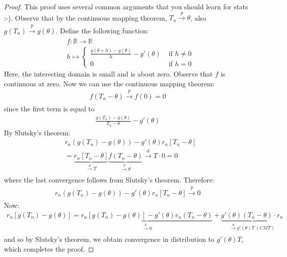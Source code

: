 \documentclass[11pt]{scrartcl}
\newcommand{\R}[0]{\mathbb{R}}
\theoremstyle{definition}
\theoremstyle{remark}
\begin{document}
{\begin{proof}
	This proof uses several common arguments that you should learn for stats :-). Observe that by the continuous mapping theorem, $T_n \xrightarrow[]{p} \theta$, also $g(T_n) \xrightarrow[]{p} g(\theta)$. Define the following function: 
	\begin{align*}
		& f: \R \rightarrow \R \\
		& h \mapsto \begin{cases}
			\frac{g(\theta + h) - g (\theta)}{h} - g'(\theta) & \text{ if } h \neq 0 \\
			0 	& \text{ if } h = 0 
		\end{cases}	
	\end{align*}
	Here, the interesting domain is small and is about zero. Observe that $f$ is continuous at zero. Now we can use the continuous mapping theorem: 
	\begin{align*}
			f(T_n - \theta) \xrightarrow[]{p} f(0) = 0 
	\end{align*}
	since the first term is equal to 
	\begin{align*}
		\frac{g(T_n) - g(\theta)}{T_n - \theta} - g'(\theta) 		
	\end{align*}
	By Slutsky's theorem: 
	\begin{align*} 
		& r_n (g(T_n) - g(\theta)) - g'(\theta ) r_n [T_n - \theta ] \\ 
		& = \underbrace{r_n [T_n - \theta]}_{\xrightarrow[]{d} T} \underbrace{f(T_n - \theta)}_{\xrightarrow[]{p} \theta} \xrightarrow[]{d} T \cdot 0 = 0 
	\end{align*} 
	where the last convergence follows from Slutsky's theorem. Therefore: 
	\begin{align*}
		r_n (g(T_n) - g(\theta)) - g'(\theta)r_n [T_n - \theta ] \xrightarrow[]{p} 0 	
	\end{align*}
	Now: 
	\begin{align*}
	r_n[g(T_n) - g(\theta)] = \underbrace{r_n [g(T_n) - g(\theta)] - g'(\theta)r_n(T_n - \theta)}_{\xrightarrow[]{p} 0} + \underbrace{g'(\theta)(T_n - \theta) \cdot r_n 	}_{\xrightarrow[]{d} g'(\theta)T\ (CMT)}
	\end{align*}
	and so by Slutsky's theorem, we obtain convergence in distribution to $g'(\theta)T$, which completes the proof.
\end{proof}

}
\end{document}
